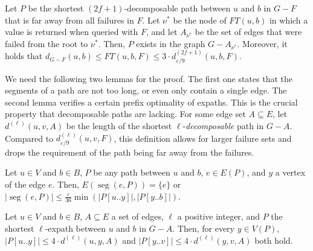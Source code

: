 \documentclass{theoretics}
\DeclareMathOperator{\seg}{seg}
\newcommand*{\length}[1]{|#1|}
\renewcommand{\le}{\leqslant}
\newcommand{\eps}{\varepsilon}
\begin{document}
\begin{lemma}
\label{lem:crucial_survival}
  Let $P$ be the shortest $(2f{+}1)$-decomposable path between $u$ and $b$ in $G-F$ 
  that is far away from all failures in $F$.
  Let $\nu^*$ be the node of $FT(u,b)$ in which a value is returned when queried with $F$, 
  and let $A_{\nu^*}$ be the set of edges that were failed from the root to $\nu^*$.
  Then, $P$ exists in the graph $G-A_{\nu^*}$.
  Moreover, it holds that 
  $d_{G-F}(u,b) \le FT(u,b,F) \le 3 \cdot d^{(2f+1)}_{\eps/9}(u,b,F)$.
\end{lemma}

We need the following two lemmas for the proof.
The first one states that the segments of a path are not too long,
or even only contain a single edge.
The second lemma verifies a certain prefix optimality of expaths.
This is the crucial property that decomposable paths are lacking.
For some edge set $A \subseteq E$,
let $d^{(\ell)}(u,v,A)$ be the length of the shortest \mbox{$\ell$-\emph{decomposable}} path in $G{-}A$.
Compared to $d^{(\ell)}_{\eps/9}(u,v,F)$,
this definition allows for larger failure sets and
drops the requirement of the path being far away from the failures.

\begin{lemma}
\label{lem:segments_not_too_large}
  Let $u \in V$ and $b \in B$,
  $P$ be any path between $u$ and $b$, $e \in E(P)$,
  and $y$ a vertex of the edge $e$.
  Then, $E(\seg(e,P)) = \{e\}$ or 
  $\length{\seg(e,P)}  \le \tfrac{\eps}{36} \min(\length{P[u..y]}, \length{P[y..b]})$. 
\end{lemma}

\begin{lemma}
\label{lem:prefix_optimality}
  Let $u \in V$ and $b \in B$, $A \subseteq E$ a set of edges, 
  $\ell$ a positive integer, and $P$ the shortest $\ell$-expath between $u$ and $b$ in $G-A$.
  Then, for every $y \in V(P)$,
  $\length{P[u..y]} \le 4 \cdot d^{(\ell)}(u,y,A)$ 
  and $\length{P[y..v]} \le 4 \cdot d^{(\ell)}(y,v,A)$ both hold.
\end{lemma}
\end{document}
